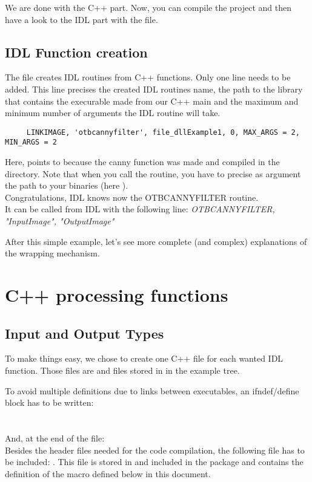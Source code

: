 We are done with the C++ part. Now, you can compile the project and then have a look to the IDL part with the  file.

\subsection{IDL Function creation}
The  file creates IDL routines from C++ functions.
Only one line needs to be added. This line precises the created IDL routines name, the path to the library that contains the execurable made from our C++ main and the maximum and minimum number of arguments the IDL routine will take.
\begin{verbatim}
     LINKIMAGE, 'otbcannyfilter', file_dllExample1, 0, MAX_ARGS = 2, MIN_ARGS = 2
\end{verbatim}

Here,  points to  because the canny function was made and compiled in the  directory.
Note that when you call the  routine, you have to precise as argument the path to your binaries (here ).\\
Congratulations, IDL knows now the OTBCANNYFILTER routine.\\
It can be called from IDL with the following line:
\emph {OTBCANNYFILTER, "InputImage", "OutputImage"}

After this simple example, let's see more complete (and complex) explanations of the wrapping mechanism.

\section{C++ processing functions}
\label{cfiles}
\subsection{Input and Output Types}
To make things easy, we chose to create one C++ file for each wanted IDL function. Those files are  and  files stored in  in the example tree.

To avoid multiple definitions due to links between executables, an ifndef/define block has to be written:\\
\\
\\
And, at the end of the  file:
\\
Besides the header files needed for the code compilation, the following file has to be included: . This file is stored in  and included in the package and contains the definition of the  macro defined below in this document.

